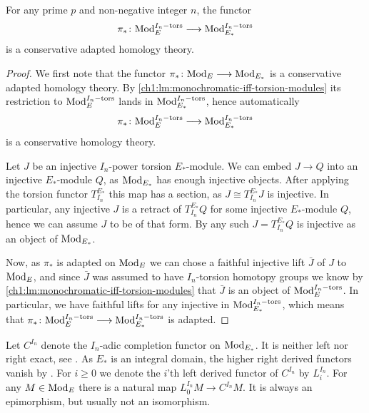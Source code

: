 \begin{lemma}
    \label{ch1:lm:conservative-adapted-torsion-modules}
    For any prime $p$ and non-negative integer $n$, the functor 
    \[\pi_*\colon \mathrm{Mod}_{E}^{I_n-\mathrm{tors}}\longrightarrow \mathrm{Mod}_{E_*}^{I_n-\mathrm{tors}}\]
    is a conservative adapted homology theory. 
\end{lemma}
\begin{proof}
    We first note that the functor $\pi_*\colon \mathrm{Mod}_{E}\longrightarrow \mathrm{Mod}_{E_*}$ is a conservative adapted homology theory. By \cref{ch1:lm:monochromatic-iff-torsion-modules} its restriction to $\mathrm{Mod}_{E}^{I_n-\mathrm{tors}}$ lands in $\mathrm{Mod}_{E_*}^{I_n-\mathrm{tors}}$, hence automatically 
    \[\pi_*\colon \mathrm{Mod}_{E}^{I_n-\mathrm{tors}}\longrightarrow \mathrm{Mod}_{E_*}^{I_n-\mathrm{tors}}\]
    is a conservative homology theory. 
    
    Let $J$ be an injective $I_n$-power torsion $E_*$-module. We can embed $J\longrightarrow Q$ into an injective $E_*$-module $Q$, as $\mathrm{Mod}_{E_*}$ has enough injective objects. After applying the torsion functor $T^{E_*}_{I_n}$ this map has a section, as $J \cong T^{E_*}_{I_n}J$ is injective. In particular, any injective $J$ is a retract of $T^{E_*}_{I_n}Q$ for some injective $E_*$-module $Q$, hence we can assume $J$ to be of that form. By \cite[2.1.4]{brodmann-sharp_1998} any such $J = T^{E_*}_{I_n}Q$ is injective as an object of $\mathrm{Mod}_{E_*}$. 
    
    Now, as $\pi_*$ is adapted on $\mathrm{Mod}_{E}$ we can chose a faithful injective lift $\bar{J}$ of $J$ to $\mathrm{Mod}_{E}$, and since $\bar{J}$ was assumed to have $I_n$-torsion homotopy groups we know by \cref{ch1:lm:monochromatic-iff-torsion-modules} that $\bar{J}$ is an object of $\mathrm{Mod}_{E}^{I_n-\mathrm{tors}}$. In particular, we have faithful lifts for any injective in $\mathrm{Mod}_{E_*}^{I_n-\mathrm{tors}}$, which means that $\pi_*\colon \mathrm{Mod}_{E}^{I_n-\mathrm{tors}}\longrightarrow \mathrm{Mod}_{E_*}^{I_n-\mathrm{tors}}$ is adapted. 
\end{proof}

Let $C^{I_n}$ denote the $I_n$-adic completion functor on $\mathrm{Mod}_{E_*}$. It is neither left nor right exact, see \cite[Appendix A.]{hovey-strickland_99}. As $E_*$ is an integral domain, the higher right derived functors vanish by \cite[5.1]{greenlees-may_92}. For $i\geq 0$ we denote the $i$'th left derived functor of $C^{I_n}$ by $L^{I_n}_i$. For any $M\in \mathrm{Mod}_{E}$ there is a natural map $L^{I_n}_0 M \longrightarrow C^{I_n}M$. It is always an epimorphism, but usually not an isomorphism. 

